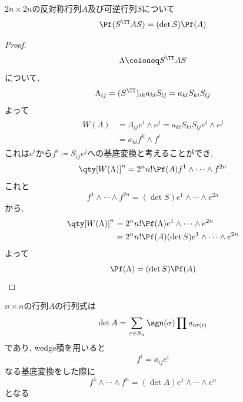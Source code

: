 \documentclass[a4paper,12pt]{jlreq}
\begin{document}
\begin{theotcolorbox}[title = 補題B]
    $2n\times 2n$の反対称行列$A$及び可逆行列$S$について
    \begin{equation}
        \Pf (S^{\TT}AS) = (\det S) \Pf (A)
    \end{equation}
\end{theotcolorbox}

\begin{proof}
    \begin{equation}
        \Lambda \coloneq S^{\TT}AS
    \end{equation}
    について,
    \begin{equation}
        \Lambda_{ij} = (S^{\TT})_{ik} a_{kl} S_{lj} = a_{kl} S_{ki} S_{lj}
    \end{equation}
    よって
    \begin{gather}
        \begin{aligned}
            W(\Lambda) & = \Lambda_{ij} e^i \wedge e^j = a_{kl} S_{ki} S_{lj} e^i \wedge e^j\\
            & = a_{kl} f^k \wedge f^l
        \end{aligned}
    \end{gather}
    これは$e^i$から$f^i \coloneq S_{ij}e^j$への基底変換と考えることができ, 
    \begin{equation}
        \qty[W(\Lambda)]^n = 2^n n! \Pf (A) f^1 \wedge \cdots \wedge f^{2n}
    \end{equation}
    これと
    \begin{equation}
        f^1 \wedge \cdots \wedge f^{2n} = (\det S) e^1 \wedge \cdots \wedge e^{2n}
    \end{equation}
    から, 
    \begin{equation}
        \begin{aligned}
            \qty[W(\Lambda)]^n & = 2^n n! \Pf (\Lambda) e^1 \wedge \cdots \wedge e^{2n}\\
            & = 2^n n! \Pf (A) (\det S) e^1 \wedge \cdots \wedge e^{2n}
        \end{aligned}
    \end{equation}
    よって
    \begin{equation}
        \Pf (\Lambda) = (\det S) \Pf (A)
    \end{equation}
\end{proof}

\begin{deftcolorbox}[title = 行列式のwedge積を用いた表し方]
    $n\times n$の行列$A$の行列式は
    \begin{equation}
        \det A = \sum_{\sigma \in S_n} \sgn(\sigma) \prod a_{i\sigma(i)}
    \end{equation}
    であり, wedge積を用いると
    \begin{equation}
        f^i = a_{ij} e^i
    \end{equation}
    なる基底変換をした際に
    \begin{equation}
        f^1 \wedge \cdots \wedge f^n = (\det A) e^1 \wedge \cdots \wedge e^n
    \end{equation}
    となる
\end{deftcolorbox}
\end{document}
